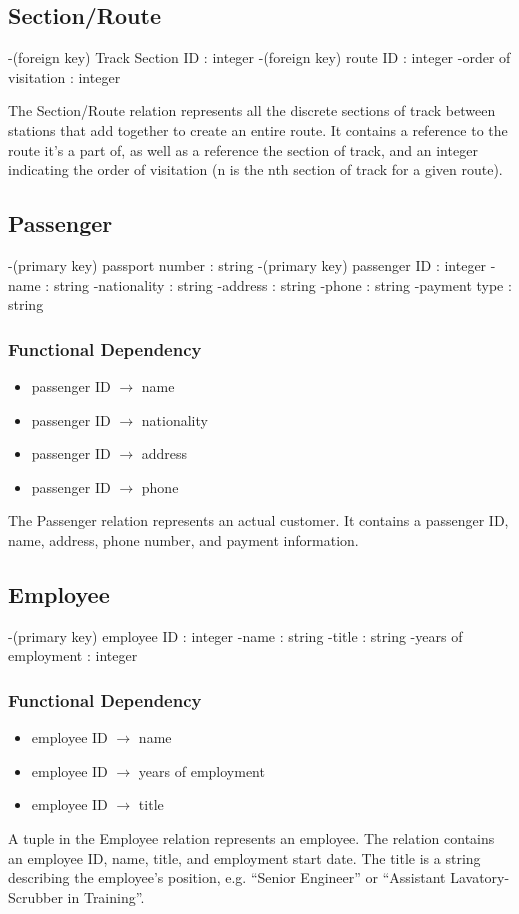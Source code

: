 \documentclass[a4paper]{article}
\begin{document}
\subsection*{Section/Route}
\begin{itemize}
-(foreign key) Track Section ID : integer
-(foreign key) route ID : integer
-order of visitation  : integer
\end{itemize}
The Section/Route relation represents all the discrete sections of track between stations that add together to create an entire route. It contains a reference to the route it's a part of, as well as a reference the section of track, and an integer indicating the order of visitation (n is the nth section of track for a given route).

\subsection*{Passenger}
\begin{itemize}
-(primary key) passport number : string
-(primary key) passenger ID : integer
-name : string
-nationality : string
-address : string
-phone : string
-payment type : string
\end{itemize}
\subsubsection*{Functional Dependency}
\begin{itemize}
\item passenger ID $\rightarrow$ name
\item passenger ID $\rightarrow$ nationality
\item passenger ID $\rightarrow$ address
\item passenger ID $\rightarrow$ phone
\end{itemize}
The Passenger relation represents an actual customer. It contains a passenger ID, name, address, phone number, and payment information.

\subsection*{Employee}
\begin{itemize}
-(primary key) employee ID : integer
-name : string
-title : string
-years of employment : integer
\end{itemize}
\subsubsection*{Functional Dependency}
\begin{itemize}
\item employee ID  $\rightarrow$ name
\item employee ID  $\rightarrow$ years of employment
\item employee ID  $\rightarrow$ title
\end{itemize}
A tuple in the Employee relation represents an employee. The relation contains an employee ID, name, title, and employment start date. The title is a string describing the employee’s position, e.g. “Senior Engineer” or “Assistant Lavatory-Scrubber in Training”.
\end{document}
